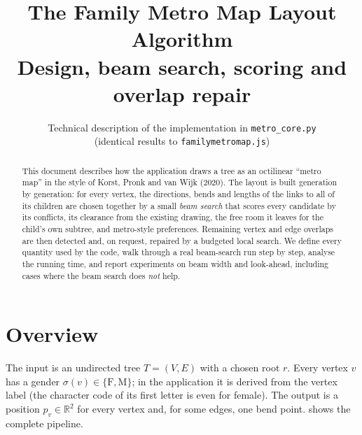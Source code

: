 \documentclass[11pt,a4paper]{article}
\title{\textbf{The Family Metro Map Layout Algorithm}\\[2pt]
\large Design, beam search, scoring and overlap repair}
\author{Technical description of the implementation in \texttt{metro\_core.py}\\
(identical results to \texttt{familymetromap.js})}
\date{}
\begin{document}
\maketitle

\begin{abstract}
\noindent This document describes how the application draws a tree as an octilinear ``metro map'' in the style of Korst, Pronk and van Wijk (2020). The layout is built generation by generation: for every vertex, the directions, bends and lengths of the links to all of its children are chosen together by a small \emph{beam search} that scores every candidate by its conflicts, its clearance from the existing drawing, the free room it leaves for the child's own subtree, and metro-style preferences. Remaining vertex and edge overlaps are then detected and, on request, repaired by a budgeted local search. We define every quantity used by the code, walk through a real beam-search run step by step, analyse the running time, and report experiments on beam width and look-ahead, including cases where the beam search does \emph{not} help.
\end{abstract}

\setcounter{tocdepth}{1}
\tableofcontents
\bigskip

\section{Overview}

The input is an undirected tree $T=(V,E)$ with a chosen root $r$. Every vertex $v$ has a gender $\sigma(v)\in\{\mathrm F,\mathrm M\}$; in the application it is derived from the vertex label (the character code of its first letter is even for female). The output is a position $p_v\in\mathbb R^2$ for every vertex and, for some edges, one bend point.  shows the complete pipeline.
\end{document}
